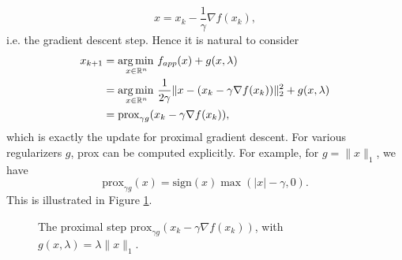 \documentclass[11pt, twoside]{report}
\begin{document}
\[x = x_k - \frac{1}{\gamma} \nabla f(x_k),\]
i.e. the gradient descent step. Hence it is natural to consider
\begin{align*}
    x_{k+1} &= \operatorname*{arg\, min \,}_{x \in \mathbb{R}^n} f_{app}(x) + g(x,\lambda) \\
    &= \operatorname*{arg\, min \,}_{x \in \mathbb{R}^n} \frac{1}{2 \gamma} \|x - (x_k - \gamma \nabla f(x_k))\|_2^2 + g(x,\lambda) \\
    &= \mathrm{prox}_{\gamma g}(x_k - \gamma \nabla f(x_k)),
\end{align*}
which is exactly the update for proximal gradient descent. For various regularizers $g$, prox can be computed explicitly. For example, for $g = \|x\|_1$, we have $$\mathrm{prox}_{\gamma g}(x) = \mathrm{sign}(x) \max(|x|-\gamma,0).$$ This is illustrated in Figure \ref{fig:prox_lasso}.

\begin{figure}[h!]
    \centering
    \caption{The proximal step $\mathrm{prox}_{\gamma g}(x_k - \gamma \nabla f(x_k))$, with $g(x,\lambda) = \lambda \|x\|_1$.}
    \label{fig:prox_lasso}
\end{figure}
\end{document}
